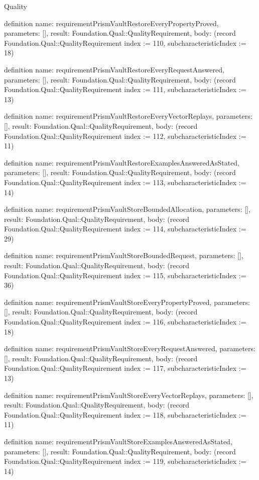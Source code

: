 \begin{lexlean}{Quality}
\begin{semanticmodule}
definition{
  name: requirementPrismVaultRestoreEveryPropertyProved,
  parameters: [],
  result: Foundation.Qual::QualityRequirement,
  body: (record Foundation.Qual::QualityRequirement {index := 110, subcharacteristicIndex := 18})
}

definition{
  name: requirementPrismVaultRestoreEveryRequestAnswered,
  parameters: [],
  result: Foundation.Qual::QualityRequirement,
  body: (record Foundation.Qual::QualityRequirement {index := 111, subcharacteristicIndex := 13})
}

definition{
  name: requirementPrismVaultRestoreEveryVectorReplays,
  parameters: [],
  result: Foundation.Qual::QualityRequirement,
  body: (record Foundation.Qual::QualityRequirement {index := 112, subcharacteristicIndex := 11})
}

definition{
  name: requirementPrismVaultRestoreExamplesAnsweredAsStated,
  parameters: [],
  result: Foundation.Qual::QualityRequirement,
  body: (record Foundation.Qual::QualityRequirement {index := 113, subcharacteristicIndex := 14})
}

definition{
  name: requirementPrismVaultStoreBoundedAllocation,
  parameters: [],
  result: Foundation.Qual::QualityRequirement,
  body: (record Foundation.Qual::QualityRequirement {index := 114, subcharacteristicIndex := 29})
}

definition{
  name: requirementPrismVaultStoreBoundedRequest,
  parameters: [],
  result: Foundation.Qual::QualityRequirement,
  body: (record Foundation.Qual::QualityRequirement {index := 115, subcharacteristicIndex := 36})
}

definition{
  name: requirementPrismVaultStoreEveryPropertyProved,
  parameters: [],
  result: Foundation.Qual::QualityRequirement,
  body: (record Foundation.Qual::QualityRequirement {index := 116, subcharacteristicIndex := 18})
}

definition{
  name: requirementPrismVaultStoreEveryRequestAnswered,
  parameters: [],
  result: Foundation.Qual::QualityRequirement,
  body: (record Foundation.Qual::QualityRequirement {index := 117, subcharacteristicIndex := 13})
}

definition{
  name: requirementPrismVaultStoreEveryVectorReplays,
  parameters: [],
  result: Foundation.Qual::QualityRequirement,
  body: (record Foundation.Qual::QualityRequirement {index := 118, subcharacteristicIndex := 11})
}

definition{
  name: requirementPrismVaultStoreExamplesAnsweredAsStated,
  parameters: [],
  result: Foundation.Qual::QualityRequirement,
  body: (record Foundation.Qual::QualityRequirement {index := 119, subcharacteristicIndex := 14})
}


\end{semanticmodule}
\end{lexlean}
